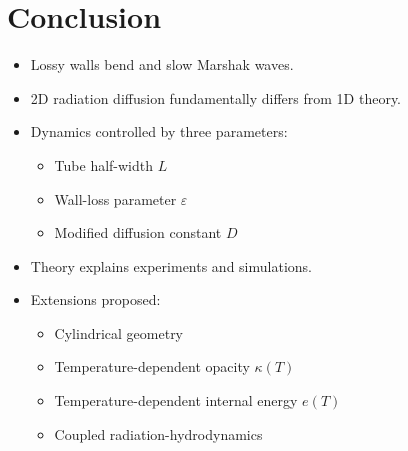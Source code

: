 \documentclass{article}
\begin{document}
\section{Conclusion}
\begin{itemize}
    \item Lossy walls bend and slow Marshak waves.
    \item 2D radiation diffusion fundamentally differs from 1D theory.
    \item Dynamics controlled by three parameters:
    \begin{itemize}
        \item Tube half-width $L$
        \item Wall-loss parameter $\varepsilon$
        \item Modified diffusion constant $D$
    \end{itemize}
    \item Theory explains experiments and simulations.
    \item Extensions proposed:
    \begin{itemize}
        \item Cylindrical geometry
        \item Temperature-dependent opacity $\kappa(T)$
        \item Temperature-dependent internal energy $e(T)$
        \item Coupled radiation-hydrodynamics
    \end{itemize}
\end{itemize}
\end{document}
